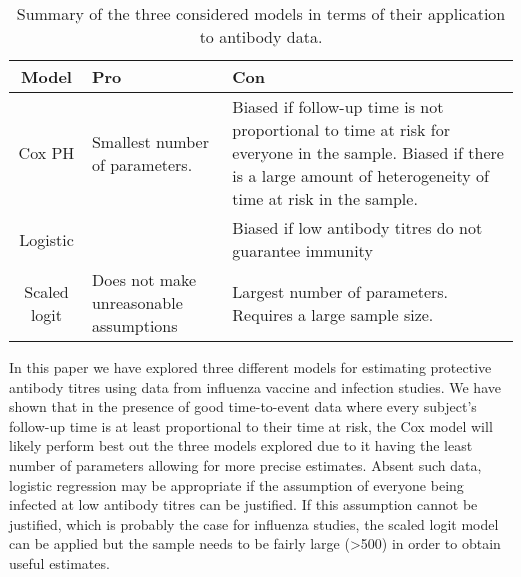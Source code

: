 \begin{table}[htp]
\centering
\caption{Summary of the three considered models in terms of their application to antibody data.}
\begin{tabular}{cp{10em}p{20em}}
\toprule
Model & Pro & Con \\
\midrule
Cox PH & Smallest number of parameters. & Biased if follow-up time is not proportional to time at risk for everyone in the sample. Biased if there is
a large amount of heterogeneity of time at risk in the sample. \\
Logistic & & Biased if low antibody titres do not guarantee immunity \\
Scaled logit & Does not make unreasonable assumptions & Largest number of parameters. Requires a large sample size. \\
\bottomrule
\end{tabular}
\end{table}

In this paper we have explored three different models for estimating protective antibody titres using data from influenza vaccine and infection studies.  We have shown that in the presence of good time-to-event data where every subject's follow-up time is at least proportional to their time at risk, the Cox model will likely perform best out the three models explored due to it having the least number of parameters allowing for more precise estimates. Absent such data, logistic regression may be appropriate if the assumption of everyone being infected at low antibody titres can be justified. If this assumption cannot be justified, which is probably the case for influenza studies, the scaled logit model can be applied but the sample needs to be fairly large (>500) in order to obtain useful estimates.
